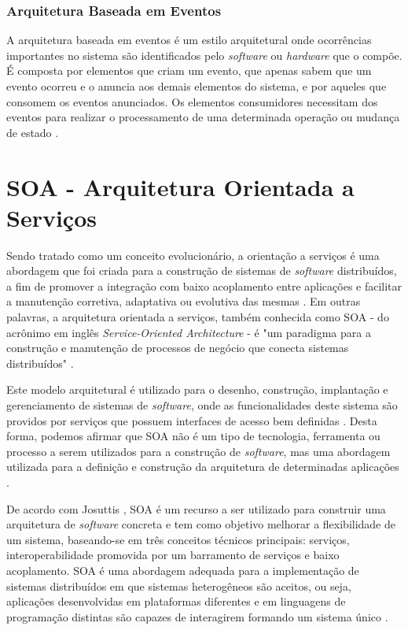 \subsubsection{Arquitetura Baseada em Eventos}
A arquitetura baseada em eventos é um estilo arquitetural onde ocorrências importantes no sistema são identificados pelo \textit{software} ou \textit{hardware} que o compõe. É composta por elementos que criam um evento, que apenas sabem que um evento ocorreu e o anuncia aos demais elementos do sistema, e por aqueles que consomem os eventos anunciados. Os elementos consumidores necessitam dos eventos para realizar o processamento de uma determinada operação ou mudança de estado \cite{rouse}.

\section{SOA - Arquitetura Orientada a Serviços}
Sendo tratado como um conceito evolucionário, a orientação a serviços é uma abordagem que foi criada para a construção de sistemas de \textit{software} distribuídos, a fim de promover a integração com baixo acoplamento entre aplicações e facilitar a manutenção corretiva, adaptativa ou evolutiva das mesmas \cite{linthicum_soainrealworld_2007}. Em outras palavras, a arquitetura orientada a serviços, também conhecida como SOA - do acrônimo em inglês \textit{Service-Oriented Architecture} - é "um paradigma para a construção e manutenção de processos de negócio que conecta sistemas distribuídos" \cite{josuttis_soa_2007}.

Este modelo arquitetural é utilizado para o desenho, construção, implantação e gerenciamento de sistemas de \textit{software}, onde as funcionalidades deste sistema são providos por serviços que possuem interfaces de acesso bem definidas \cite{lewis_getting_2010}. Desta forma, podemos afirmar que SOA não é um tipo de tecnologia, ferramenta ou processo a serem utilizados para a construção de \textit{software}, mas uma abordagem utilizada para a definição e construção da arquitetura de determinadas aplicações \cite{oliveira_interoperabilidade}.

De acordo com Josuttis \cite{josuttis_soa_2007}, SOA é um recurso a ser utilizado para construir uma arquitetura de \textit{software} concreta e tem como objetivo melhorar a flexibilidade de um sistema, baseando-se em três conceitos técnicos principais: serviços, interoperabilidade promovida por um barramento de serviços e baixo acoplamento. SOA é uma abordagem adequada para a implementação de sistemas distribuídos em que sistemas heterogêneos são aceitos, ou seja, aplicações desenvolvidas em plataformas diferentes e em linguagens de programação distintas são capazes de interagirem formando um sistema único \cite{josuttis_soa_2007}.


